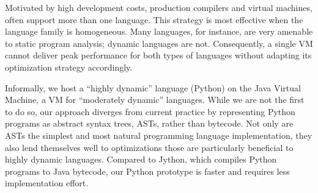 \thesisabstract
{

Motivated by high development costs, production compilers and virtual machines, often support more than one language.
This strategy is most effective when the language family is homogeneous.
Many languages, for instance, are very amenable to static program analysis; dynamic languages are not.
Consequently, a single VM cannot deliver peak performance for both types of languages without adapting its optimization strategy accordingly.

Informally, we host a “highly dynamic” language (Python) on the Java Virtual Machine, a VM for “moderately dynamic” languages.
While we are not the first to do so, our approach diverges from current practice by representing Python programs as abstract syntax trees, ASTs, rather than bytecode.
Not only are ASTs the simplest and most natural programming language implementation,
they also lend themselves well to optimizations those are particularly beneficial to highly dynamic languages.
Compared to Jython, which compiles Python programs to Java bytecode, our Python prototype is faster and requires less implementation effort.

}


